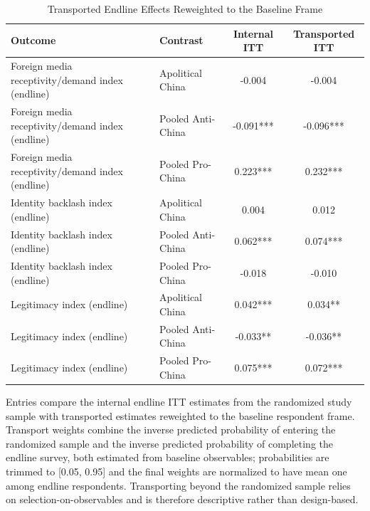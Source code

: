 \begin{table}[H]
\centering
\caption{Transported Endline Effects Reweighted to the Baseline Frame}
\label{tab:transported_effects_t1}
\footnotesize
\begin{threeparttable}
\begin{tabular}{llcc}
\toprule
Outcome & Contrast & Internal ITT & Transported ITT \\
\midrule
Foreign media receptivity/demand index (endline) & Apolitical China & -0.004 & -0.004 \\
Foreign media receptivity/demand index (endline) & Pooled Anti-China & -0.091*** & -0.096*** \\
Foreign media receptivity/demand index (endline) & Pooled Pro-China & 0.223*** & 0.232*** \\
Identity backlash index (endline) & Apolitical China & 0.004 & 0.012 \\
Identity backlash index (endline) & Pooled Anti-China & 0.062*** & 0.074*** \\
Identity backlash index (endline) & Pooled Pro-China & -0.018 & -0.010 \\
Legitimacy index (endline) & Apolitical China & 0.042*** & 0.034** \\
Legitimacy index (endline) & Pooled Anti-China & -0.033** & -0.036** \\
Legitimacy index (endline) & Pooled Pro-China & 0.075*** & 0.072*** \\
\bottomrule
\end{tabular}
\begin{tablenotes}[flushleft]
\footnotesize
\item Entries compare the internal endline ITT estimates from the randomized study sample with transported estimates reweighted to the baseline respondent frame. Transport weights combine the inverse predicted probability of entering the randomized sample and the inverse predicted probability of completing the endline survey, both estimated from baseline observables; probabilities are trimmed to [0.05, 0.95] and the final weights are normalized to have mean one among endline respondents. Transporting beyond the randomized sample relies on selection-on-observables and is therefore descriptive rather than design-based.
\end{tablenotes}
\end{threeparttable}
\end{table}
